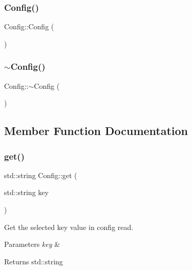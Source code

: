 \subsubsection{\texorpdfstring{Config()}{Config()}}
{\footnotesize\ttfamily Config\+::\+Config (\begin{DoxyParamCaption}{ }\end{DoxyParamCaption})}

\mbox{\label{classConfig_a543dce59b66475c5108088ee4ce1cdfc}} 
\subsubsection{\texorpdfstring{$\sim$Config()}{~Config()}}
{\footnotesize\ttfamily Config\+::$\sim$\+Config (\begin{DoxyParamCaption}{ }\end{DoxyParamCaption})}



\subsection{Member Function Documentation}
\mbox{\label{classConfig_a3c55d333e4f503cf0de93e6e4e229592}} 
\subsubsection{\texorpdfstring{get()}{get()}}
{\footnotesize\ttfamily std\+::string Config\+::get (\begin{DoxyParamCaption}\item[{std\+::string}]{key }\end{DoxyParamCaption})}



Get the selected key value in config read. 


\begin{DoxyParams}{Parameters}
{\em key} & \\
\hline
\end{DoxyParams}
\begin{DoxyReturn}{Returns}
std\+::string 
\end{DoxyReturn}
\mbox{\label{classConfig_a50f1975553317a337740bec3ea316f10}} 
